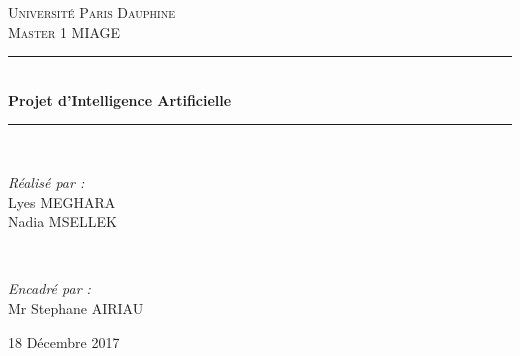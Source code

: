 \documentclass[11pt]{article}
\begin{document}

\begin{titlepage}
	\newcommand{\HRule}{\rule{\linewidth}{0.5mm}} 
	
	\center
	
	
	\textsc{\LARGE Université Paris Dauphine}\\[1.5cm] 
	
	\textsc{\Large Master 1 MIAGE}\\[0.5cm] 
	

	
	
	\HRule\\[0.4cm]
	
	{\huge\bfseries Projet d'Intelligence Artificielle}\\[0.4cm]
	
	\HRule\\[1.5cm]
	
	
	\begin{minipage}{0.4\textwidth}
		\begin{flushleft}
			\large
			\textit{Réalisé par :}\\
			Lyes \textsc{MEGHARA}\\ 
			Nadia \textsc{MSELLEK}\\ 
		\end{flushleft}
	\end{minipage}
	~
	\begin{minipage}{0.4\textwidth}
		\begin{flushright}
			\large
			\textit{Encadré par :}\\
			Mr Stephane \textsc{AIRIAU}%

		\end{flushright}
	\end{minipage}
	

	
	
	\vfill\vfill 
	
	{\large18 Décembre 2017} 
	




\end{titlepage}
\end{document}
